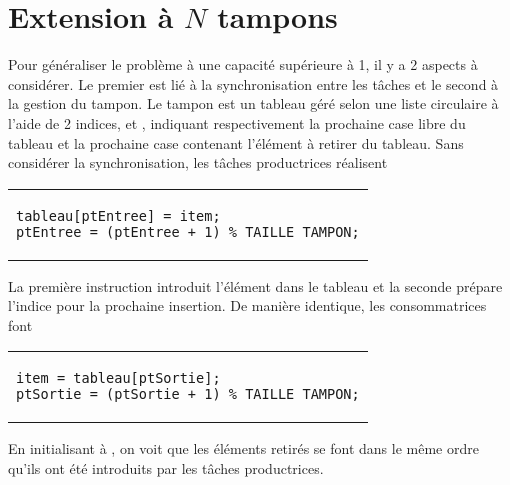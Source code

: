 \section{Extension à $N$ tampons}
Pour généraliser le problème à une capacité supérieure à 1, il y a 2 aspects à considérer. Le premier est lié à la synchronisation entre les tâches et le second à la gestion du tampon.
Le tampon est un tableau géré selon une liste circulaire à l'aide de 2 indices,  et , indiquant respectivement la prochaine case libre du tableau et la prochaine case contenant l'élément à retirer du tableau. Sans considérer la synchronisation, les tâches productrices réalisent
\begin{center}
\vspace{-0.2 cm}
\begin{tabular}{l}
\begin{lstlisting}
tableau[ptEntree] = item;
ptEntree = (ptEntree + 1) % TAILLE_TAMPON;
\end{lstlisting}
\end{tabular}
\end{center}
La première instruction introduit l'élément dans le tableau et la seconde prépare l'indice pour la prochaine insertion. De manière identique, les consommatrices font
\begin{center}
\vspace{-0.2 cm}
\begin{tabular}{l}
\begin{lstlisting}
item = tableau[ptSortie];
ptSortie = (ptSortie + 1) % TAILLE_TAMPON;
\end{lstlisting}
\end{tabular}
\end{center}
En initialisant  à , on voit que les éléments retirés se font dans le même ordre qu'ils ont été introduits par les tâches productrices.

